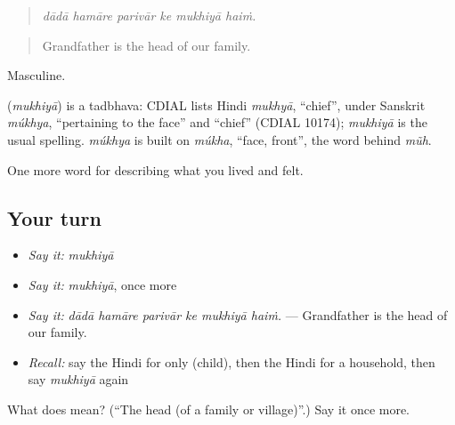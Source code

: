 \begin{quote}
     
\end{quote}

\begin{quote}
\emph{dādā hamāre parivār ke mukhiyā haiṁ.}
\end{quote}

\begin{quote}
Grandfather is the head of our family.
\end{quote}

Masculine.

\begin{cousinweb}
\textbf{} (\emph{mukhiyā}) is a tadbhava: CDIAL lists Hindi \emph{mukhyā}, \textquotedblleft{}chief\textquotedblright{}, under Sanskrit \emph{múkhya}, \textquotedblleft{}pertaining to the face\textquotedblright{} and \textquotedblleft{}chief\textquotedblright{} (CDIAL 10174); \emph{mukhiyā} is the usual spelling. \emph{múkhya} is built on \emph{múkha}, \textquotedblleft{}face, front\textquotedblright{}, the word behind \emph{mũh}.
\end{cousinweb}

\begin{grammarlens}[title={What you've built}]
One more word for describing what you lived and felt.
\end{grammarlens}

\subsection*{Your turn}
\begin{itemize}
\raggedright
  \item \emph{Say it:} \emph{mukhiyā}
  \item \emph{Say it:} \emph{mukhiyā}, once more
  \item \emph{Say it:} \emph{dādā hamāre parivār ke mukhiyā haiṁ.} — Grandfather is the head of our family.
  \item \emph{Recall:} say the Hindi for only (child), then the Hindi for a household, then say \emph{mukhiyā} again
\end{itemize}

\begin{tcolorbox}[breakable,colback=teal!4,colframe=teal!35!black,title={Before you move on}]
What does  mean? (\textquotedblleft{}The head (of a family or village)\textquotedblright{}.) Say it once more.
\end{tcolorbox}
